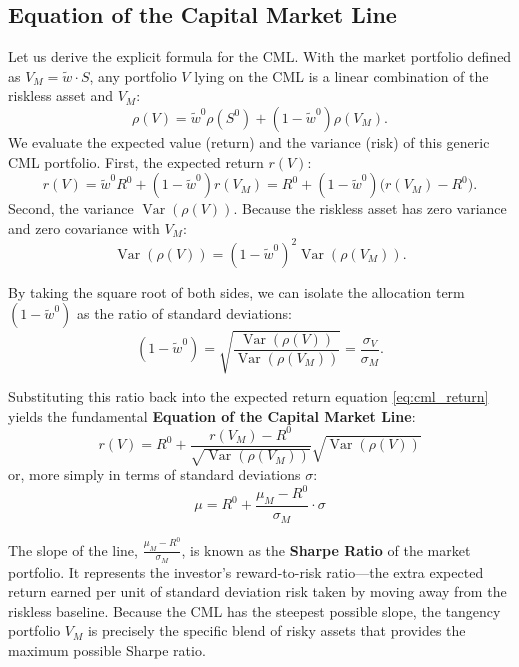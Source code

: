 \subsection{Equation of the Capital Market Line}

Let us derive the explicit formula for the CML. With the market portfolio defined as $V_M = \tilde{w} \cdot S$, any portfolio $V$ lying on the CML is a linear combination of the riskless asset and $V_M$:
\begin{equation}
    \rho(V) = \tilde{w}^0 \rho(S^0) + (1 - \tilde{w}^0) \rho(V_M).
\end{equation}
We evaluate the expected value (return) and the variance (risk) of this generic CML portfolio. First, the expected return $r(V)$:
\begin{equation}
    r(V) = \tilde{w}^0 R^0 + (1 - \tilde{w}^0) r(V_M) = R^0 + (1 - \tilde{w}^0) \big( r(V_M) - R^0 \big). \label{eq:cml_return}
\end{equation}
Second, the variance $\operatorname{Var}(\rho(V))$. Because the riskless asset has zero variance and zero covariance with $V_M$:
\begin{equation}
    \operatorname{Var}(\rho(V)) = (1 - \tilde{w}^0)^2 \operatorname{Var}(\rho(V_M)). \label{eq:cml_variance}
\end{equation}

By taking the square root of both sides, we can isolate the allocation term $(1 - \tilde{w}^0)$ as the ratio of standard deviations:
\begin{equation*}
    (1 - \tilde{w}^0) = \sqrt{ \frac{\operatorname{Var}(\rho(V))}{\operatorname{Var}(\rho(V_M))} } = \frac{\sigma_V}{\sigma_{M}}.
\end{equation*}

Substituting this ratio back into the expected return equation \eqref{eq:cml_return} yields the fundamental \textbf{Equation of the Capital Market Line}:
\begin{equation}
    r(V) = R^0 + \frac{r(V_M) - R^0}{\sqrt{\operatorname{Var}(\rho(V_M))}} \sqrt{\operatorname{Var}(\rho(V))}
\end{equation}
or, more simply in terms of standard deviations $\sigma$:
\begin{equation}
    \mu = R^0 + \frac{\mu_M - R^0}{\sigma_M} \cdot \sigma
\end{equation}

The slope of the line, $\frac{\mu_M - R^0}{\sigma_M}$, is known as the \textbf{Sharpe Ratio} of the market portfolio. It represents the investor's reward-to-risk ratio—the extra expected return earned per unit of standard deviation risk taken by moving away from the riskless baseline. Because the CML has the steepest possible slope, the tangency portfolio $V_M$ is precisely the specific blend of risky assets that provides the maximum possible Sharpe ratio.
